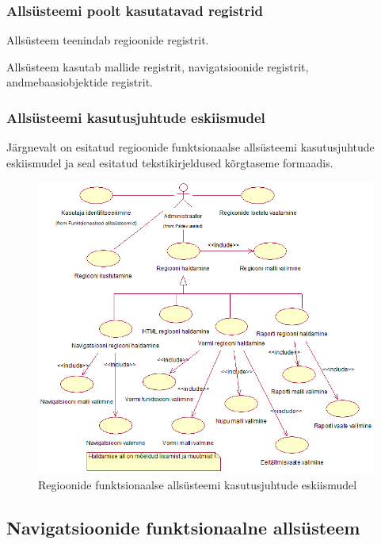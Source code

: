 \documentclass[a4paper,12pt]{article} %
\begin{document}
\subsubsection{Allsüsteemi poolt kasutatavad registrid}
Allsüsteem teenindab regioonide registrit.\par
Allsüsteem kasutab mallide registrit, navigatsioonide registrit, andmebaasiobjektide registrit.
\subsubsection{Allsüsteemi kasutusjuhtude eskiismudel}
Järgnevalt on esitatud regioonide funktsionaalse allsüsteemi kasutusjuhtude eskiismudel ja seal esitatud tekstikirjeldused kõrgtaseme formaadis.
\begin{figure}[H]
\begin{center}
\includegraphics[bb=0 0 709 615,scale=0.85]{./diagrams/regions-subsystem-use-case-digram.png}
\caption{Regioonide funktsionaalse allsüsteemi kasutusjuhtude eskiismudel}
\end{center}
\end{figure}

\subsection{Navigatsioonide funktsionaalne allsüsteem}
\end{document}
